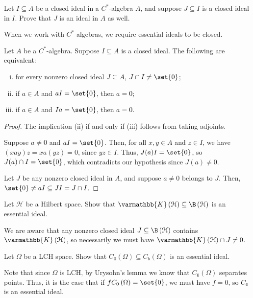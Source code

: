 \documentclass[10pt]{mypackage}
\renewcommand*{\mathbb}[1]{\varmathbb{#1}}
\newcommand{\K}{\mathbb{K}}
\begin{document}
\begin{exercise}
  Let $I\subseteq A$ be a closed ideal in a $C^{\ast}$-algebra $A$, and suppose $J\subseteq I$ is a closed ideal in $I$. Prove that $J$ is an ideal in $A$ as well.
\end{exercise}
When we work with $C^{\ast}$-algebras, we require essential ideals to be closed.
\begin{proposition}
  Let $A$ be a $C^{\ast}$-algebra. Suppose $I\subseteq A$ is a closed ideal. The following are equivalent:
  \begin{enumerate}[(i)]
    \item for every nonzero closed ideal $J\subseteq A$, $J\cap I \neq \set{0}$;
    \item if $a\in A$ and $aI = \set{0}$, then $a = 0$;
    \item if $a\in A$ and $Ia = \set{0}$, then $a = 0$.
  \end{enumerate}
\end{proposition}
\begin{proof}
  The implication (ii) if and only if (iii) follows from taking adjoints.\newline

  Suppose $a\neq 0$ and $aI = \set{0}$. Then, for all $x,y\in A$ and $z\in I$, we have $\left(xay\right)z = xa\left(yz\right) = 0$, since $yz\in I$. Thus, $J(a)I = \set{0}$, so $J(a)\cap I = \set{0}$, which contradicts our hypothesis since $J(a)\neq 0$.\newline

  Let $J$ be any nonzero closed ideal in $A$, and suppose $a\neq 0$ belongs to $J$. Then, $\set{0}\neq aI\subseteq JI = J\cap I$.
\end{proof}
\begin{exercise}
  Let $\mathcal{H}$ be a Hilbert space. Show that $\mathbb{K}\left(\mathcal{H}\right)\subseteq \B\left(\mathcal{H}\right)$ is an essential ideal.
\end{exercise}
\begin{solution}
  We are aware that any nonzero closed ideal $J\subseteq \B\left(\mathcal{H}\right)$ contains $\K\left(\mathcal{H}\right)$, so necessarily we must have $\K\left(\mathcal{H}\right)\cap J \neq 0$.
\end{solution}
\begin{exercise}
  Let $\Omega$ be a LCH space. Show that $C_0\left(\Omega\right)\subseteq C_b\left(\Omega\right)$ is an essential ideal.
\end{exercise}
\begin{solution}
  Note that since $\Omega$ is LCH, by Urysohn's lemma we know that $C_0\left(\Omega\right)$ separates points. Thus, it is the case that if $fC_0\left(\Omega\right) = \set{0}$, we must have $f = 0$, so $C_0$ is an essential ideal.
\end{solution}
\end{document}

